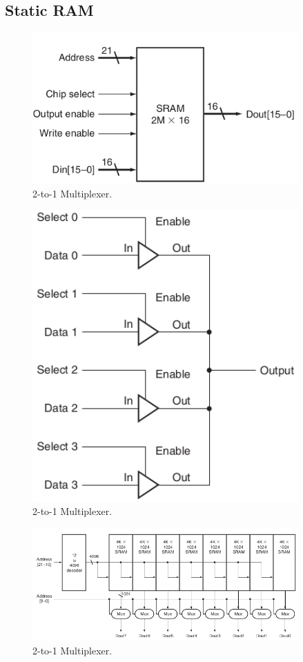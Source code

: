 \documentclass[a4paper, 11pt,oneside]{article}
\begin{document}
\subsection{Static RAM}

\begin{figure}[H]
	\begin{center}
	\includegraphics[width=4in]{sram0.png}
	\caption{2-to-1 Multiplexer.}
	\label{fig:mux} 
	\end{center}
\end{figure}

\begin{figure}[H]
	\begin{center}
	\includegraphics[width=4in]{sram1.png}
	\caption{2-to-1 Multiplexer.}
	\label{fig:mux} 
	\end{center}
\end{figure}

\begin{figure}[H]
	\begin{center}
	\includegraphics[width=4in]{sram2.png}
	\caption{2-to-1 Multiplexer.}
	\label{fig:mux} 
	\end{center}
\end{figure}
\end{document}
